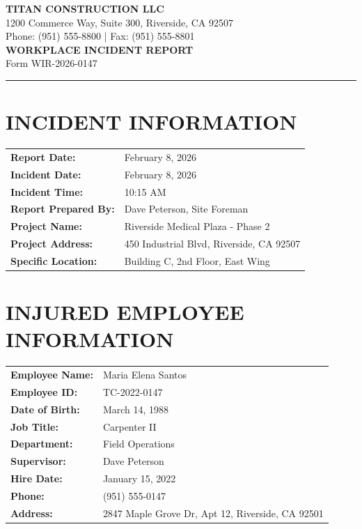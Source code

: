 \documentclass[11pt]{article}
\begin{document}
\begin{center}
{\Large\bfseries\color{titanblue} TITAN CONSTRUCTION LLC}\\[0.3em]
{\small 1200 Commerce Way, Suite 300, Riverside, CA 92507}\\
{\small Phone: (951) 555-8800 | Fax: (951) 555-8801}\\[1.5em]
{\LARGE\bfseries WORKPLACE INCIDENT REPORT}\\[0.5em]
{\large Form WIR-2026-0147}
\end{center}

\vspace{1em}
\hrule
\vspace{1em}

\section*{INCIDENT INFORMATION}

\begin{tabular}{@{}p{4cm}p{10cm}@{}}
\textbf{Report Date:} & February 8, 2026 \\
\textbf{Incident Date:} & February 8, 2026 \\
\textbf{Incident Time:} & 10:15 AM \\
\textbf{Report Prepared By:} & Dave Peterson, Site Foreman \\
\textbf{Project Name:} & Riverside Medical Plaza - Phase 2 \\
\textbf{Project Address:} & 450 Industrial Blvd, Riverside, CA 92507 \\
\textbf{Specific Location:} & Building C, 2nd Floor, East Wing \\
\end{tabular}

\section*{INJURED EMPLOYEE INFORMATION}

\begin{tabular}{@{}p{4cm}p{10cm}@{}}
\textbf{Employee Name:} & Maria Elena Santos \\
\textbf{Employee ID:} & TC-2022-0147 \\
\textbf{Date of Birth:} & March 14, 1988 \\
\textbf{Job Title:} & Carpenter II \\
\textbf{Department:} & Field Operations \\
\textbf{Supervisor:} & Dave Peterson \\
\textbf{Hire Date:} & January 15, 2022 \\
\textbf{Phone:} & (951) 555-0147 \\
\textbf{Address:} & 2847 Maple Grove Dr, Apt 12, Riverside, CA 92501 \\
\end{tabular}
\end{document}
